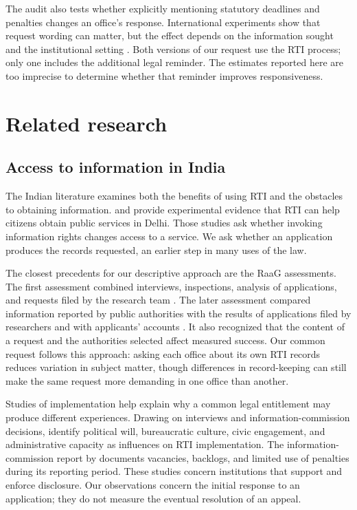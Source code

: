 \documentclass[11pt]{article}
\begin{document}
The audit also tests whether explicitly mentioning statutory deadlines and penalties changes an office's response. International experiments show that request wording can matter, but the effect depends on the information sought and the institutional setting \citep{worthy2017,grimmelikhuijsen2019,spac2018,spac2025}. Both versions of our request use the RTI process; only one includes the additional legal reminder. The estimates reported here are too imprecise to determine whether that reminder improves responsiveness.

\section{Related research}
\subsection{Access to information in India}
The Indian literature examines both the benefits of using RTI and the obstacles to obtaining information. \citet{peisakhin2010} and \citet{peisakhin2012} provide experimental evidence that RTI can help citizens obtain public services in Delhi. Those studies ask whether invoking information rights changes access to a service. We ask whether an application produces the records requested, an earlier step in many uses of the law.

The closest precedents for our descriptive approach are the RaaG assessments. The first assessment combined interviews, inspections, analysis of applications, and requests filed by the research team \citep{raag2009}. The later assessment compared information reported by public authorities with the results of applications filed by researchers and with applicants' accounts \citep{raag2014}. It also recognized that the content of a request and the authorities selected affect measured success. Our common request follows this approach: asking each office about its own RTI records reduces variation in subject matter, though differences in record-keeping can still make the same request more demanding in one office than another.

Studies of implementation help explain why a common legal entitlement may produce different experiences. Drawing on interviews and information-commission decisions, \citet{relly2020} identify political will, bureaucratic culture, civic engagement, and administrative capacity as influences on RTI implementation. The information-commission report by \citet{sns2025} documents vacancies, backlogs, and limited use of penalties during its reporting period. These studies concern institutions that support and enforce disclosure. Our observations concern the initial response to an application; they do not measure the eventual resolution of an appeal.
\end{document}
